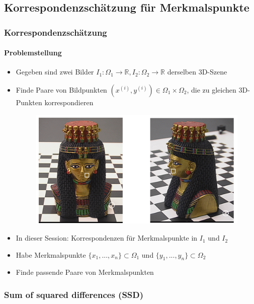 \documentclass[12pt, a4paper, oneside]{article}
\begin{document}
\subsection{Korrespondenzschätzung für Merkmalspunkte}

\subsubsection{Korrespondenzschätzung}
\paragraph*{Problemstellung}
\begin{itemize}
  \item Gegeben sind zwei Bilder $I_1:\Omega_1\to\mathbb{R}, I_2:\Omega_2\to\mathbb{R}$ derselben 3D-Szene
  \item Finde Paare von Bildpunkten $(x^{(i)},y^{(i)})\in \Omega_1\times\Omega_2$, die zu gleichen 3D-Punkten korrespondieren
  \begin{figure}[htbp]
      \centering
      \includegraphics[scale=0.6]{../img/1-20.png}
      \label{img/1-20}
  \end{figure}
\end{itemize}

\begin{itemize}
  \item In dieser Session: Korrespondenzen für Merkmalspunkte in $I_1$ und $I_2$
  \item Habe Merkmalspunkte $\{x_1,...,x_n\}\subset\Omega_1$ und $\{y_1,...,y_n\}\subset\Omega_2$
  \item Finde passende Paare von Merkmalspunkten
\end{itemize}

\subsubsection{Sum of squared differences (SSD)}
\end{document}
